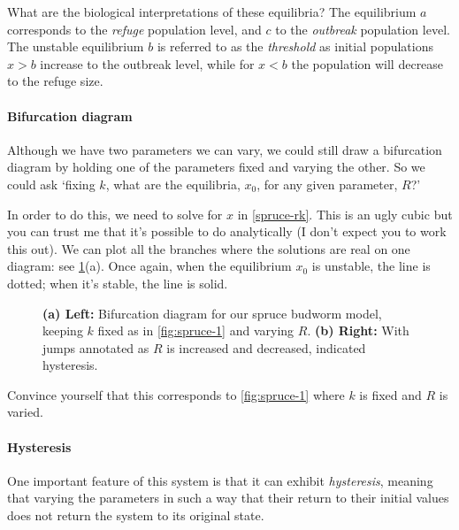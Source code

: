 \documentclass[main.tex]{subfiles}
\begin{document}
What are the biological interpretations of these equilibria? The equilibrium $a$ corresponds to the \emph{refuge} population level, and $c$ to the \emph{outbreak} population level. The unstable equilibrium $b$ is referred to as the \emph{threshold} as initial populations $x > b$ increase to the outbreak level, while for $x < b$ the population will decrease to the refuge size. 

\paragraph{Bifurcation diagram} Although we have two parameters we can vary, we could still draw a bifurcation diagram by holding one of the parameters fixed and varying the other. So we could ask `fixing $k$, what are the equilibria, $x_0$, for any given parameter, $R$?' 

In order to do this, we need to solve for $x$ in \cref{spruce-rk}. This is an ugly cubic but you can trust me that it's possible to do analytically (I don't expect you to work this out). We can plot all the branches where the solutions are real on one diagram: see \cref{fig:spruce-budworm-bifurcation}(a). Once again, when the equilibrium $x_0$ is unstable, the line is dotted; when it's stable, the line is solid.

\begin{figure}%
	\centering
	
	
	\caption{\textbf{(a) Left:} Bifurcation diagram for our spruce budworm model, keeping $k$ fixed as in \cref{fig:spruce-1} and varying $R$. \textbf{(b) Right:} With jumps annotated as $R$ is increased and decreased, indicated hysteresis.}
	\label{fig:spruce-budworm-bifurcation}
\end{figure}%

\begin{do-it-yourself}
	Convince yourself that this corresponds to \cref{fig:spruce-1} where $k$ is fixed and $R$ is varied.
\end{do-it-yourself} 

\paragraph{Hysteresis} One important feature of this system is that it can exhibit \emph{hysteresis}, meaning that varying the parameters in such a way that their return to their initial values does not return the system to its original state.
\end{document}
